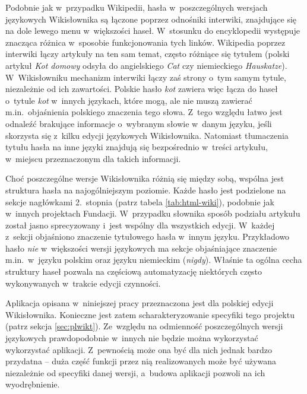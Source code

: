 \documentclass{pracamgr}
\begin{document}
Podobnie jak w~przypadku Wikipedii, hasła w~poszczególnych wersjach językowych Wikisłownika są łączone poprzez odnośniki interwiki, znajdujące się na dole lewego menu w~większości haseł. W~stosunku do encyklopedii występuje znacząca różnica w~sposobie funkcjonowania tych linków. Wikipedia poprzez interwiki łączy artykuły na ten sam temat, często różniące się tytułem (polski artykuł \emph{Kot domowy} odsyła do angielskiego \emph{Cat} czy niemieckiego \emph{Hauskatze}). W~Wikisłowniku mechanizm interwiki łączy zaś strony o~tym samym tytule, niezależnie od ich zawartości. Polskie hasło \emph{kot} zawiera więc łącza do haseł o~tytule \emph{kot} w~innych językach, które mogą, ale nie muszą zawierać m.in.\ objaśnienia polskiego znaczenia tego słowa. Z~tego względu łatwo jest odnaleźć brakujące informacje o~wybranym słowie w~danym języku, jeśli skorzysta się z~kilku edycji językowych Wikisłownika. Natomiast tłumaczenia tytułu hasła na inne języki znajdują się bezpośrednio w~treści artykułu, w~miejscu przeznaczonym dla takich informacji.

Choć poszczególne wersje Wikisłownika różnią się między sobą, wspólna jest struktura hasła na najogólniejszym poziomie. Każde hasło jest podzielone na sekcje nagłówkami 2.~stopnia (patrz tabela \ref{tab:html-wiki}), podobnie jak w~innych projektach Fundacji. W~przypadku słownika sposób podziału artykułu został jasno sprecyzowany i~jest wspólny dla wszystkich edycji. W~każdej z~sekcji objaśniono znaczenie tytułowego hasła w~innym języku. Przykładowo hasło \emph{nie} w~większości wersji językowych ma sekcje objaśniające znaczenie m.in.\ w~języku polskim oraz języku niemieckim (\emph{nigdy}). Właśnie ta ogólna cecha struktury haseł pozwala na częściową automatyzację niektórych często wykonywanych w~trakcie edycji czynności.

Aplikacja opisana w~niniejszej pracy przeznaczona jest dla polskiej edycji Wikisłownika. Konieczne jest zatem scharakteryzowanie specyfiki tego projektu (patrz sekcja \ref{sec:plwikt}). Ze~względu na odmienność poszczególnych wersji językowych prawdopodobnie w~innych nie będzie można wykorzystać wykorzystać aplikacji. Z~pewnością może ona być dla nich jednak bardzo przydatna -- duża część funkcji przez nią realizowanych może być używana niezależnie od specyfiki danej wersji, a~budowa aplikacji pozwoli na ich wyodrębnienie.
\end{document}
